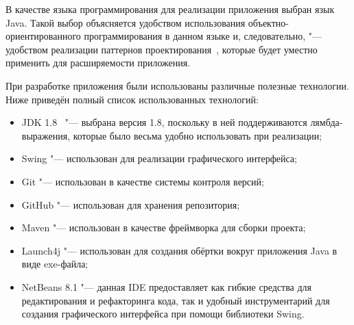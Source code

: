 В качестве языка программирования для реализации приложения выбран язык Java. Такой выбор объясняется удобством использования объектно-ориентирован\-ного программирования в данном языке и, следовательно, "--- удобством реализации паттернов проектирования~\cite{gamma}, которые будет уместно применить для расширяемости приложения.

При разработке приложения были использованы различные полезные технологии. Ниже приведён полный список использованных технологий:

\begin{itemize}
\item JDK 1.8~\cite{java} "--- выбрана версия 1.8, поскольку в ней поддерживаются лямбда-выражения, которые было весьма удобно использовать при реализации;
\item Swing "--- использован для реализации графического интерфейса;
\item Git "--- использован в качестве системы контроля версий;
\item GitHub "--- использован для хранения репозитория;
\item Maven "--- использован в качестве фреймворка для сборки проекта;
\item Launch4j "--- использован для создания обёртки вокруг приложения Java в виде exe-файла;
\item NetBeans 8.1 "--- данная IDE предоставляет как гибкие средства для редактирования и рефакторинга кода, так и удобный инструментарий для создания графического интерфейса при помощи библиотеки Swing.
\end{itemize}